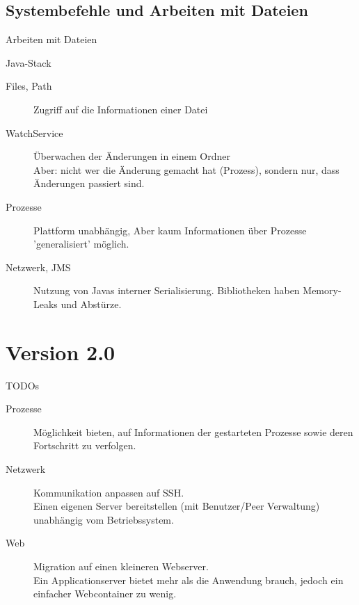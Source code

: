 \documentclass{beamer}
\begin{document}
\subsection{Systembefehle und Arbeiten mit Dateien}


 

\begin{frame}{Arbeiten mit Dateien}
	
	
	\begin{block}{Java-Stack}
	\begin{description}
		\item[Files, Path] Zugriff auf die Informationen einer Datei 
		\item[WatchService] Überwachen der Änderungen in einem Ordner\\Aber: nicht wer die Änderung gemacht hat (Prozess), sondern nur, dass Änderungen passiert sind.
		\item[Prozesse] Plattform unabhängig, Aber kaum Informationen über Prozesse 'generalisiert' möglich.
		\item[Netzwerk, JMS] Nutzung von Javas interner Serialisierung. Bibliotheken haben Memory-Leaks und Abstürze.
	 
	\end{description}
\end{block}
 
\end{frame}


\section{Version 2.0}


\begin{frame}
	
	
	\begin{block}{TODOs}
		\begin{description}
			\item[Prozesse] Möglichkeit bieten, auf Informationen der gestarteten Prozesse sowie deren Fortschritt zu verfolgen.
			\item[Netzwerk] Kommunikation anpassen auf SSH. \\
			Einen eigenen Server bereitstellen (mit Benutzer/Peer Verwaltung) unabhängig vom Betriebssystem.
			\item[Web] Migration auf einen kleineren Webserver.\\
			Ein Applicationserver bietet mehr als die Anwendung brauch, jedoch ein einfacher Webcontainer zu wenig.
			
		
			\end{description}
	\end{block}
	
	\bigskip 
	
	
\end{frame}
\end{document}
